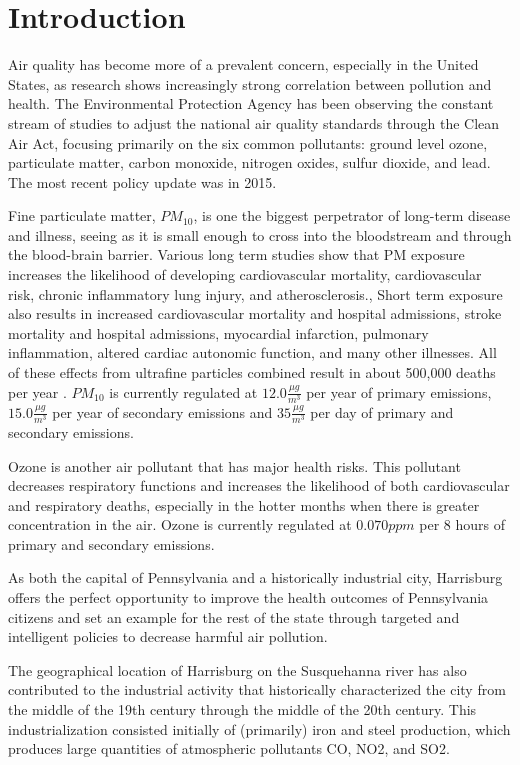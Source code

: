 \documentclass[11pt,journal]{IEEEtran}
\begin{document}
\section{Introduction}

Air quality has become more of a prevalent concern, especially in the United States, as research shows increasingly strong correlation between pollution and health. The Environmental Protection Agency has been observing the constant stream of studies to adjust the national air quality standards through the Clean Air Act, focusing primarily on the six common pollutants: ground level ozone, particulate matter, carbon monoxide, nitrogen oxides, sulfur dioxide, and lead. The most recent policy update was in 2015.

Fine particulate matter, $PM_{10}$, is one the biggest perpetrator of long-term disease and illness, seeing as it is small enough to cross into the bloodstream and through the blood-brain barrier. Various long term studies show that PM exposure increases the likelihood of developing cardiovascular mortality, cardiovascular risk, chronic inflammatory lung injury, and atherosclerosis., Short term exposure also results in increased cardiovascular mortality and hospital admissions, stroke mortality and hospital admissions, myocardial infarction, pulmonary inflammation, altered cardiac autonomic function, and many other illnesses\cite{pope, nel}. All of these effects from ultrafine particles combined result in about 500,000 deaths per year \cite{nel}. $PM_{10}$ is currently regulated at $12.0 \frac{\mu g}{m^3}$ per year of primary emissions, $15.0 \frac{\mu g}{m^3}$ per year of secondary emissions and $35 \frac{\mu g}{m^3}$ per day of primary and secondary emissions.

Ozone is another air pollutant that has major health risks. This pollutant decreases respiratory functions and increases the likelihood of both cardiovascular and respiratory deaths, especially in the hotter months when there is greater concentration in the air\cite{doiozone}. Ozone is currently regulated at $0.070 ppm$ per 8 hours of primary and secondary emissions.

As both the capital of Pennsylvania and a historically industrial city, Harrisburg offers the perfect opportunity to improve the health outcomes of Pennsylvania citizens and set an example for the rest of the state through targeted and intelligent policies to decrease harmful air pollution.

The geographical location of Harrisburg on the Susquehanna river has also contributed to the industrial activity that historically characterized the city from the middle of the 19th century through the middle of the 20th century\cite{industrializes}. This industrialization consisted initially of (primarily) iron and steel production, which produces large quantities of atmospheric pollutants CO, NO2, and SO2\cite{sasi}.
\end{document}
